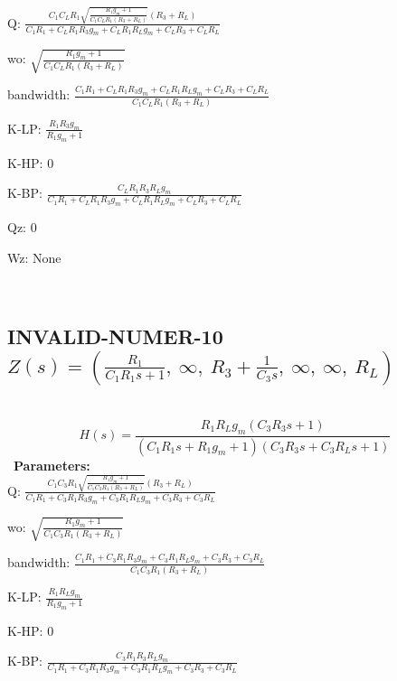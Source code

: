 \documentclass{article}
\begin{document}
Q: $\frac{C_{1} C_{L} R_{1} \sqrt{\frac{R_{1} g_{m} + 1}{C_{1} C_{L} R_{1} \left(R_{3} + R_{L}\right)}} \left(R_{3} + R_{L}\right)}{C_{1} R_{1} + C_{L} R_{1} R_{3} g_{m} + C_{L} R_{1} R_{L} g_{m} + C_{L} R_{3} + C_{L} R_{L}}$\ 

wo: $\sqrt{\frac{R_{1} g_{m} + 1}{C_{1} C_{L} R_{1} \left(R_{3} + R_{L}\right)}}$\ 

bandwidth: $\frac{C_{1} R_{1} + C_{L} R_{1} R_{3} g_{m} + C_{L} R_{1} R_{L} g_{m} + C_{L} R_{3} + C_{L} R_{L}}{C_{1} C_{L} R_{1} \left(R_{3} + R_{L}\right)}$\ 

K-LP: $\frac{R_{1} R_{3} g_{m}}{R_{1} g_{m} + 1}$\ 

K-HP: $0$\ 

K-BP: $\frac{C_{L} R_{1} R_{3} R_{L} g_{m}}{C_{1} R_{1} + C_{L} R_{1} R_{3} g_{m} + C_{L} R_{1} R_{L} g_{m} + C_{L} R_{3} + C_{L} R_{L}}$\ 

Qz: $0$\ 

Wz: $\text{None}$\ 

\ 

\subsection{INVALID-NUMER-10 $Z(s) = \left( \frac{R_{1}}{C_{1} R_{1} s + 1}, \  \infty, \  R_{3} + \frac{1}{C_{3} s}, \  \infty, \  \infty, \  R_{L}\right)$ } \ 
\textbf{\[H(s) = \frac{R_{1} R_{L} g_{m} \left(C_{3} R_{3} s + 1\right)}{\left(C_{1} R_{1} s + R_{1} g_{m} + 1\right) \left(C_{3} R_{3} s + C_{3} R_{L} s + 1\right)}\] } \ 
\textbf{Parameters:}\\ 

Q: $\frac{C_{1} C_{3} R_{1} \sqrt{\frac{R_{1} g_{m} + 1}{C_{1} C_{3} R_{1} \left(R_{3} + R_{L}\right)}} \left(R_{3} + R_{L}\right)}{C_{1} R_{1} + C_{3} R_{1} R_{3} g_{m} + C_{3} R_{1} R_{L} g_{m} + C_{3} R_{3} + C_{3} R_{L}}$\ 

wo: $\sqrt{\frac{R_{1} g_{m} + 1}{C_{1} C_{3} R_{1} \left(R_{3} + R_{L}\right)}}$\ 

bandwidth: $\frac{C_{1} R_{1} + C_{3} R_{1} R_{3} g_{m} + C_{3} R_{1} R_{L} g_{m} + C_{3} R_{3} + C_{3} R_{L}}{C_{1} C_{3} R_{1} \left(R_{3} + R_{L}\right)}$\ 

K-LP: $\frac{R_{1} R_{L} g_{m}}{R_{1} g_{m} + 1}$\ 

K-HP: $0$\ 

K-BP: $\frac{C_{3} R_{1} R_{3} R_{L} g_{m}}{C_{1} R_{1} + C_{3} R_{1} R_{3} g_{m} + C_{3} R_{1} R_{L} g_{m} + C_{3} R_{3} + C_{3} R_{L}}$\ 
\end{document}
